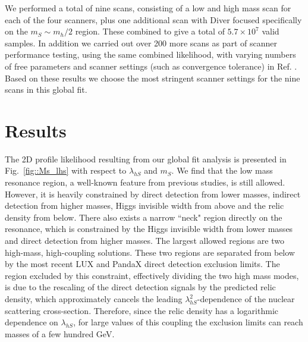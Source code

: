 \documentclass{PoS}
\newcommand\diver{\textsf{Diver}\xspace}
\newcommand{\sss}{\scriptscriptstyle}
\newcommand{\ms}{m_{\sss S}}
\newcommand{\lhs}{\lambda_{h\sss S}}
\newcommand{\mh}{m_h}
\begin{document}
We performed a total of nine scans, consisting of a low and high mass scan for each of the four scanners, plus one additional scan with \diver focused specifically on the $\ms\sim \mh/2$ region.  These combined to give a total of $5.7\times10^7$ valid samples.  In addition we carried out over 200 more scans as part of scanner performance testing, using the same combined likelihood, with varying numbers of free parameters and scanner settings (such as convergence tolerance) in Ref. \cite{Workgroup:2017htr}.  Based on these results we choose the most stringent scanner settings for the nine scans in this global fit.

\section{Results}
The 2D profile likelihood resulting from our global fit analysis is presented in Fig.~\ref{fig::Ms_lhs} with respect to $\lhs$ and $\ms$.  We find that the low mass resonance region, a well-known feature from previous studies, is still allowed.  However, it is heavily constrained by direct detection from lower masses, indirect detection from higher masses, Higgs invisible width from above and the relic density from below.  There also exists a narrow ``neck" region directly on the resonance, which is constrained by the Higgs invisible width from lower masses and direct detection from higher masses.  The largest allowed regions are two high-mass, high-coupling solutions.  These two regions are separated from below by the most recent LUX and PandaX direct detection exclusion limits.  The region excluded by this constraint, effectively dividing the two high mass modes, is due to the rescaling of the direct detection signals by the predicted relic density, which approximately cancels the leading $\lhs^2$-dependence of the nuclear scattering cross-section.  Therefore, since the relic density has a logarithmic dependence on $\lhs$,  for large values of this coupling the exclusion limits can reach masses of a few hundred GeV.
\end{document}
